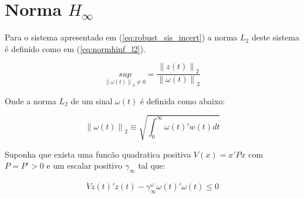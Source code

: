 \section{Norma $H_{\infty}$}
\label{sec:normHinf}

Para o sistema apresentado em (\ref{eq:robust_sis_incert}) a norma $L_2$ deste sistema
é definido como em (\ref{eq:normhinf_l2}).

\begin{equation}
\underset{\left \| \omega(t) \right \|_2 \neq 0}{sup}=\frac{\left \| z(t) \right \|_2}{\left \| \omega(t) \right \|_2}
\label{eq:normhinf_l2}
\end{equation}

Onde a norma $L_2$ de um sinal $\omega(t)$ é definida como abaixo:

\begin{equation}
\left \| \omega(t) \right \|_2 \equiv \sqrt{\int_{0}^{\infty}\omega(t)'w(t) dt}
\nonumber
\end{equation}

Suponha que exista uma funcão quadratica positiva $V(x)=x'Px$ com $P=P'>0$ e um escalar positivo
$\gamma_{\infty}$ tal que:


\begin{equation}
\dot{V}z(t)'z(t)-\gamma_{\infty}^{\omega}\omega(t)'\omega(t)\leq 0
\nonumber
\end{equation}

